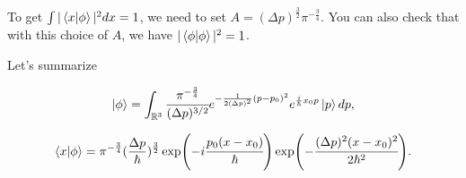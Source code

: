 \documentclass[main.tex]{subfiles}
\begin{document}
To get $\int |\bra{x}\ket{\phi}|^2 dx = 1$, we need to set $A = (\Delta p)^{\frac{3}{2}} \pi^{-\frac{3}{4}}$. You can also check that with this choice of $A$, we have $|\bra{\phi}\ket{\phi}|^2 = 1$.

Let's summarize

\begin{equation}
\ket{\phi} = \int_{\mathbb{R}^3} \cfrac{\pi^{-\frac{3}{4}}}{(\Delta p)^{3/2}} e^{-\frac{1}{2(\Delta p)^2}(p - p_0)^2} e^{\frac{i}{\hbar}x_0 p}\ket{p} dp,
\end{equation}

\begin{equation}
\bra{x}\ket{\phi} =  \pi^{-\frac{3}{4}} (\frac{\Delta p}{\hbar})^{\frac{3}{2}} 
\exp(-i\cfrac{p_0(x - x_0)}{\hbar})\exp( - \cfrac{(\Delta p)^2(x - x_0)^2}{2\hbar^2}).
\end{equation}

%
%
%
%
%
%
\end{document}
